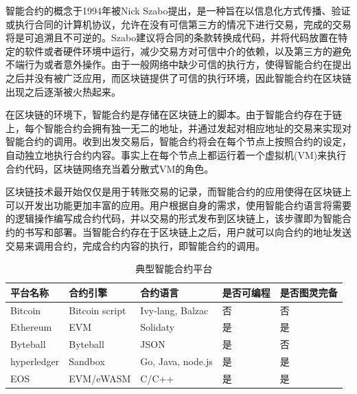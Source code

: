 智能合约的概念于1994年被Nick Szabo提出\cite{szabo1996smart}，是一种旨在以信息化方式传播、验证或执行合同的计算机协议，允许在没有可信第三方的情况下进行交易，完成的交易将是可追溯且不可逆的。Szabo建议将合同的条款转换成代码，并将代码放置在特定的软件或者硬件环境中运行，减少交易方对可信中介的依赖，以及第三方的避免不端行为或者意外操作。由于一般网络中缺少可信的执行方，使得智能合约在提出之后并没有被广泛应用，而区块链提供了可信的执行环境，因此智能合约在区块链出现之后逐渐被火热起来。

在区块链的环境下，智能合约是存储在区块链上的脚本。由于智能合约存在于链上，每个智能合约会拥有独一无二的地址，并通过发起对相应地址的交易来实现对智能合约的调用。收到出发交易后，智能合约将会在每个节点上按照合约的设定，自动独立地执行合约内容。事实上在每个节点上都运行着一个虚拟机(VM)来执行合约代码，区块链网络充当着分散式VM的角色。

区块链技术最开始仅仅是用于转账交易的记录，而智能合约的应用使得在区块链上可以开发出功能更加丰富的应用。用户根据自身的需求，使用智能合约语言将需要的逻辑操作编写成合约代码，并以交易的形式发布到区块链上，该步骤即为智能合约的书写和部署。当智能合约存在于区块链上之后，用户就可以向合约的地址发送交易来调用合约，完成合约内容的执行，即智能合约的调用。


\begin{table}[!h] %
\centering   
\begin{tabular}{|l|l|l|l|l|} %
 
\hline  
平台名称 & 合约引擎 & 合约语言 &  是否可编程 & 是否图灵完备 \\
\hline
\hline
Bitcoin\cite{nakamoto2008bitcoin} & Bitcoin script & Ivy-lang, Balzac & 否 & 否 \\
\hline
Ethereum\cite{buterin2013ethereum} & EVM & Solidaty & 是 & 是 \\
\hline
Byteball\cite{churyumov2016byteball} & Byteball & JSON & 是 & 否 \\
\hline
hyperledger\cite{cachin2016architecture} & Sandbox & Go, Java, node.js & 是 & 是 \\
\hline 
EOS & EVM/eWASM & C/C++ & 是 & 是 \\


 
\hline  
\end{tabular}  
\caption{典型智能合约平台}\label{table:smart_contract} %
\end{table}  

